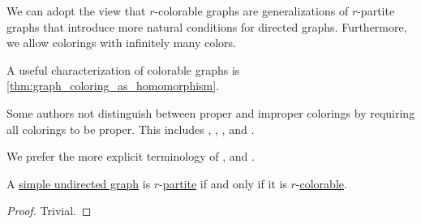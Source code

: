 \begin{comments}
  \item We can adopt the view that \( r \)-colorable graphs are generalizations of \( r \)-partite graphs that introduce more natural conditions for directed graphs. Furthermore, we allow colorings with infinitely many colors.

  \item A useful characterization of colorable graphs is \cref{thm:graph_coloring_as_homomorphism}.

  \item Some authors not distinguish between proper and improper colorings by requiring all colorings to be proper. This includes
  \cite[119]{Diestel2017GraphTheory},
  \cite[126]{Harary1969GraphTheory},
  \cite[145]{Bollobás1998ModernGraphTheory},
  \cite[def. 10.8.1]{Rosen2019DiscreteMathematics} and
  \cite[374]{Новиков2013ДискретнаяМатематика}.

  We prefer the more explicit terminology of
  \cite[395]{Erickson2019Algorithms},
  \cite[\S 53]{ЕмеличевИПр1990ТеорияГрафов} and
  \cite[141]{Мирчев2001Графи}.
\end{comments}

\begin{proposition}\label{thm:k_colorable_iff_multipartite}
  A \hyperref[def:undirected_graph]{simple undirected graph} is \( r \)-\hyperref[def:multipartite_graph]{partite} if and only if it is \( r \)-\hyperref[def:graph_coloring/colorable]{colorable}.
\end{proposition}
\begin{proof}
  Trivial.
\end{proof}

